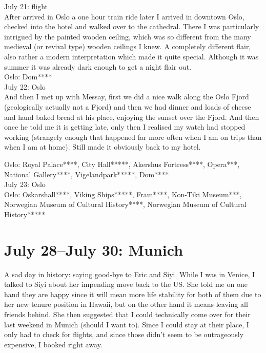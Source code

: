 July 21: flight\\
After arrived in Oslo a one hour train ride later I arrived in downtown Oslo, checked into the hotel and walked over to the cathedral. There I was particularly intrigued by the painted wooden ceiling, which was so different from the many medieval (or revival type) wooden ceilings I knew. A completely different flair, also rather a modern interpretation which made it quite special. Although it was summer it was already dark enough to get a night flair out.\\

Oslo: Dom****\\

July 22: Oslo\\

And then I met up with Messay, first we did a nice walk along the Oslo Fjord (geologically actually not a Fjord) and then we had dinner and loads of cheese and hand baked bread at his place, enjoying the sunset over the Fjord. And then once he told me it is getting late, only then I realised my watch had stopped working (strangely enough that happened far more often when I am on trips than when I am at home).  Still made it obviously back to my hotel.

Oslo: Royal Palace****, City Hall*****, Akershus Fortress****, Opera***, National Gallery****, Vigelandpark*****, Dom****\\

July 23: Oslo\\
Oslo: Oskarshall****, Viking Ships*****, Fram****, Kon-Tiki Museum***, Norwegian Museum of Cultural History****, Norwegian Museum of Cultural History*****

\section{July 28--July 30: Munich}
\label{Munich2017}

A sad day in history: saying good-bye to Eric and Siyi. While I was in Venice, I talked to Siyi about her impending move back to the US. She told me on one hand they are happy since it will mean more life stability for both of them due to her new tenure position in Hawaii, but on the other hand it means leaving all friends behind. She then suggested that I could technically come over for their last weekend in Munich (should I want to). Since I could stay at their place, I only had to check for flights, and since those didn't seem to be outrageously expensive, I booked right away.\\

